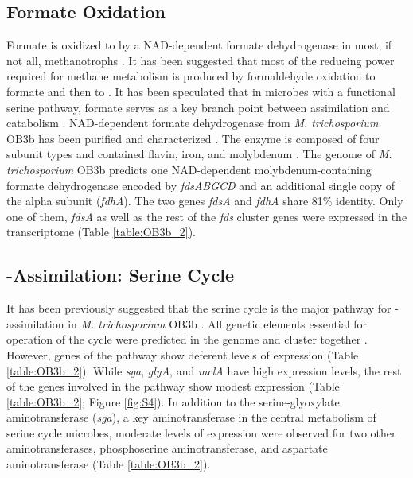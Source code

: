 \subsection{Formate Oxidation}
Formate is oxidized to  by a NAD-dependent formate dehydrogenase in most, if not all, methanotrophs \cite{anthony1982}.
It has been suggested that most of the reducing power required for methane metabolism is produced by formaldehyde oxidation to formate and then to  \cite{hanson1996}.
It has been speculated that in microbes with a functional serine pathway, formate serves as a key branch point between assimilation and catabolism \cite{chistoserdova2011}.
NAD-dependent formate dehydrogenase from \textit{M. trichosporium} OB3b has been purified and characterized \cite{jollie1991}.
The enzyme is composed of four subunit types and contained flavin, iron, and molybdenum \cite{jollie1991}.
The genome of \textit{M. trichosporium} OB3b predicts one NAD-dependent molybdenum-containing formate dehydrogenase encoded by \textit{fdsABGCD} and an additional single copy of the alpha subunit (\textit{fdhA}).
The two genes \textit{fdsA} and \textit{fdhA} share 81\% identity.
Only one of them, \textit{fdsA} as well as the rest of the \textit{fds} cluster genes were expressed in the transcriptome (Table \ref{table:OB3b_2}).

\subsection{-Assimilation: Serine Cycle}
It has been previously suggested that the serine cycle is the major pathway for -assimilation in \textit{M. trichosporium} OB3b \cite{strom1974}.
All genetic elements essential for operation of the cycle were predicted in the genome and cluster together \cite{stein2010}.
However, genes of the pathway show deferent levels of expression (Table \ref{table:OB3b_2}).
While \textit{sga}, \textit{glyA}, and \textit{mclA} have high expression levels, the rest of the genes involved in the pathway show modest expression (Table \ref{table:OB3b_2}; Figure \ref{fig:S4}).
In addition to the serine-glyoxylate aminotransferase (\textit{sga}), a key aminotransferase in the central metabolism of serine cycle microbes, moderate levels of expression were observed for two other aminotransferases, phosphoserine aminotransferase, and aspartate aminotransferase (Table \ref{table:OB3b_2}).

